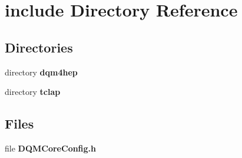 \section{include Directory Reference}
\label{dir_8ee1a5e78eaec319fe5d64075812fc61}
\subsection*{Directories}
\begin{DoxyCompactItemize}
\item 
directory {\bf dqm4hep}
\item 
directory {\bf tclap}
\end{DoxyCompactItemize}
\subsection*{Files}
\begin{DoxyCompactItemize}
\item 
file {\bf D\+Q\+M\+Core\+Config.\+h}
\end{DoxyCompactItemize}
